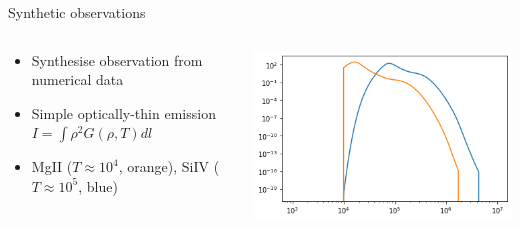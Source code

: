 \documentclass[10pt,aspectratio=169,usenames,dvipsnames]{beamer}
\begin{document}
\begin{frame}{Synthetic observations}
\begin{columns}
\begin{column}{0.4\textwidth}
\begin{itemize}
    \item Synthesise observation from numerical data
    \item Simple optically-thin emission $I= \int \rho^2 G(\rho,T) dl$
    \item MgII ($T \approx 10^4$, orange), SiIV ($T\approx 10^5$, blue)
\end{itemize}
\end{column}
\begin{column}{0.6\textwidth}
\includegraphics[width=0.95\linewidth]{2023Dundee/Figures/intenstestplot_lineprofile.png}
\end{column}
\end{columns}
\end{frame}
\end{document}
